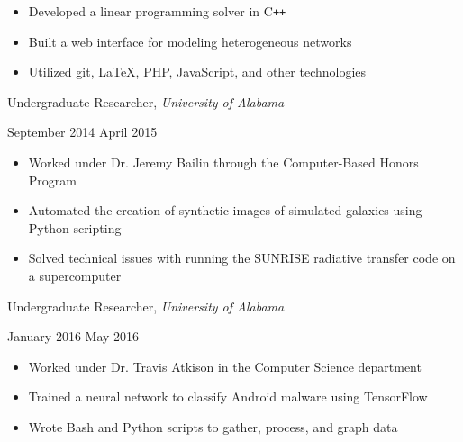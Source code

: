 \documentclass[11pt]{article}
\begin{document}
\begin{itemize}
  \item Developed a linear programming solver in C\texttt{++}
  \item Built a web interface for modeling heterogeneous networks
  \item Utilized git, \LaTeX, PHP, JavaScript, and other technologies
\end{itemize}

\vspace{0.4em}
\begin{minipage}[t]{0.65\textwidth}
\flushleft
Undergraduate Researcher, \textit{University of Alabama}\\
\end{minipage}
\begin{minipage}[t]{0.3\textwidth}
\flushright
September 2014 \space \textemdash \space April 2015\\
\end{minipage}

\begin{itemize}
  \item Worked under Dr. Jeremy Bailin through the Computer-Based Honors Program
  \item Automated the creation of synthetic images of simulated galaxies using Python scripting
  \item Solved technical issues with running the SUNRISE radiative transfer code on a supercomputer
\end{itemize}

\vspace{0.4em}
\begin{minipage}[t]{0.65\textwidth}
\flushleft
Undergraduate Researcher, \textit{University of Alabama}\\
\end{minipage}
\begin{minipage}[t]{0.3\textwidth}
\flushright
January 2016 \space \textemdash \space May 2016\\
\end{minipage}

\begin{itemize}
  \item Worked under Dr. Travis Atkison in the Computer Science department
  \item Trained a neural network to classify Android malware using TensorFlow
  \item Wrote Bash and Python scripts to gather, process, and graph data
\end{itemize}
\end{document}
